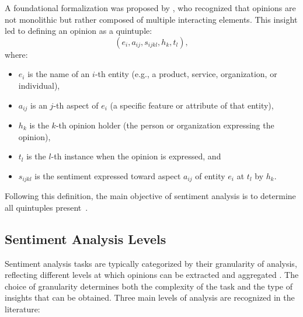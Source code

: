 \documentclass[a4paper,twoside,12pt]{book}
\begin{document}
A foundational formalization was proposed by \cite{Liu2012sentiment}, who recognized that opinions are not monolithic but rather composed of multiple interacting elements. This insight led to defining an opinion as a quintuple:
\begin{equation}
	(e_i, a_{ij}, s_{ijkl}, h_k, t_l),
\end{equation}
where:
\begin{itemize}
	\item $e_i$ is the name of an $i$-th entity (e.g., a product, service, organization, or individual),
	\item $a_{ij}$ is an $j$-th aspect of $e_i$ (a specific feature or attribute of that entity),
	\item $h_k$ is the $k$-th opinion holder (the person or organization expressing the opinion),
	\item $t_l$ is the $l$-th instance when the opinion is expressed, and
	\item $s_{ijkl}$ is the sentiment expressed toward aspect $a_{ij}$ of entity $e_i$ at $t_l$ by $h_k$.
\end{itemize}

Following this definition, the main objective of sentiment analysis is to determine all quintuples present~\cite{azzeddine2018sentiment}.

\subsection{Sentiment Analysis Levels}

Sentiment analysis tasks are typically categorized by their granularity of analysis, reflecting different levels at which opinions can be extracted and aggregated \cite{azzeddine2018sentiment}. The choice of granularity determines both the complexity of the task and the type of insights that can be obtained. Three main levels of analysis are recognized in the literature:
\end{document}

